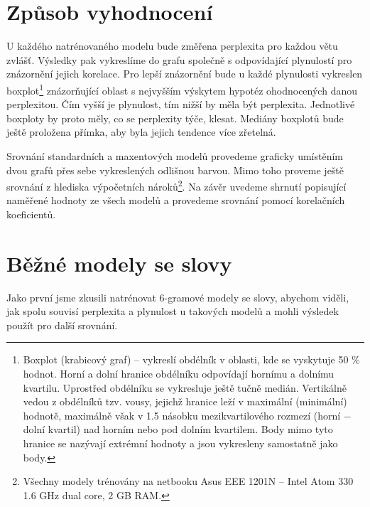 \documentclass[12pt,a4paper]{report}
\begin{document}
\section{Způsob vyhodnocení}
U každého natrénovaného modelu bude změřena perplexita pro každou větu zvlášť. Výsledky pak vykreslíme do grafu společně s odpovídající plynulostí pro znázornění jejich korelace. Pro lepší znázornění bude u každé plynulosti vykreslen boxplot\footnote{Boxplot (krabicový graf) -- vykreslí obdélník v oblasti, kde se vyskytuje 50 \% hodnot. Horní a dolní hranice obdélníku odpovídají hornímu a dolnímu kvartilu. Uprostřed obdélníku se vykresluje ještě tučně medián. Vertikálně vedou z obdélníků tzv. vousy, jejichž hranice leží v maximální (minimální) hodnotě, maximálně však v 1.5 násobku mezikvartilového rozmezí (horní $-$ dolní kvartil) nad horním nebo pod dolním kvartilem. Body mimo tyto hranice se nazývají extrémní hodnoty a jsou vykresleny samostatně jako body.} znázorňující oblast s nejvyšším výskytem hypotéz ohodnocených danou perplexitou. Čím vyšší je plynulost, tím nižší by měla být perplexita. Jednotlivé boxploty by proto měly, co se perplexity týče, klesat. Mediány boxplotů bude ještě proložena přímka, aby byla jejich tendence více zřetelná.

Srovnání standardních a maxentových modelů provedeme graficky umístěním dvou grafů přes sebe vykreslených odlišnou barvou. Mimo toho proveme ještě srovnání z hlediska výpočetních nároků\footnote{Všechny modely trénovány na netbooku Asus EEE 1201N -- Intel Atom 330 1.6 GHz dual core, 2 GB RAM.}. Na závěr uvedeme shrnutí popisující naměřené hodnoty ze všech modelů a provedeme srovnání pomocí korelačních koeficientů.

\section{Běžné modely se slovy}
Jako první jsme zkusili natrénovat 6-gramové modely se slovy, abychom viděli, jak spolu souvisí perplexita a plynulost u takových modelů a mohli výsledek použít pro další srovnání.
\end{document}
